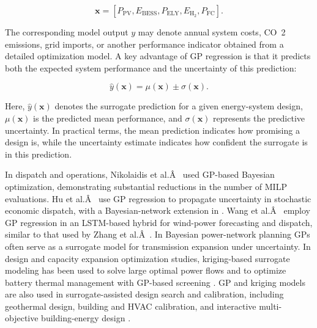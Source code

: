 \documentclass[final,5p,times,twocolumn]{elsarticle}
\begin{document}
$$\begin{equation}
 \mathbf{x} = \left[ P_{\mathrm{PV}}, E_{\mathrm{BESS}}, P_{\mathrm{ELY}}, E_{\mathrm{H_2}}, P_{\mathrm{FC}} \right].
\end{equation}$$

The corresponding model output $y$ may denote annual system costs, CO~2~
emissions, grid imports, or another performance indicator obtained from
a detailed optimization model. A key advantage of GP regression is that
it predicts both the expected system performance and the uncertainty of
this prediction:

$$\begin{equation}
 \hat{y}(\mathbf{x}) = \mu(\mathbf{x}) \pm \sigma(\mathbf{x}).
\end{equation}$$

Here, $\hat{y}(\mathbf{x})$ denotes the surrogate prediction for a given
energy-system design, $\mu(\mathbf{x})$ is the predicted mean
performance, and $\sigma(\mathbf{x})$ represents the predictive
uncertainty. In practical terms, the mean prediction indicates how
promising a design is, while the uncertainty estimate indicates how
confident the surrogate is in this prediction.

In dispatch and operations, Nikolaidis et al.Â~\cite{Nikolaidis2021} used
GP-based Bayesian optimization, demonstrating substantial reductions in
the number of MILP evaluations. Hu et al.Â~\cite{Hu2020,Hu2021671} use GP
regression to propagate uncertainty in stochastic economic dispatch,
with a Bayesian-network extension in \cite{Volodina2022}. Wang et
al.Â~\cite{Wang2023} employ GP regression in an LSTM-based hybrid for
wind-power forecasting and dispatch, similar to that used by Zhang et
al.Â~\cite{Zhang2019270}. In Bayesian power-network planning \cite{Lawson201647}
GPs often serve as a surrogate model for transmission expansion under
uncertainty. In design and capacity expansion optimization studies,
kriging-based surrogate modeling has been used to solve large optimal
power flows \cite{Deng2020831} and to optimize battery thermal management
with GP-based screening \cite{Li2021,Babaeiyazdi2021,Kong2021}.
GP and kriging models are also used in surrogate-assisted design search
and calibration, including geothermal design, building and HVAC
calibration, and interactive multi-objective building-energy design
\cite{Schulte2020,Chakrabarty2021,Aghaei Pour2022303}.
\end{document}
